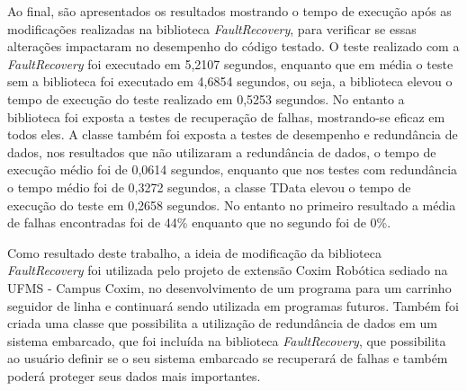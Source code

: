 Ao final, são apresentados os resultados  mostrando o tempo de execução após as modificações realizadas na biblioteca \textit{FaultRecovery}, para verificar se essas alterações impactaram no desempenho do código testado. O teste realizado com a \textit{FaultRecovery} foi executado em 5,2107 segundos, enquanto que em média o teste sem a biblioteca foi executado em 4,6854 segundos, ou seja, a biblioteca elevou o tempo de execução do teste realizado em 0,5253 segundos. No entanto a biblioteca foi exposta a testes de recuperação de falhas, mostrando-se eficaz em todos eles. A classe também foi exposta a testes de desempenho e redundância de dados, nos resultados que não utilizaram a redundância de dados, o tempo de execução médio foi de 0,0614 segundos, enquanto que nos testes com redundância o tempo médio foi de 0,3272 segundos, a classe TData elevou o tempo de execução do teste em 0,2658 segundos. No entanto no primeiro resultado a média de falhas encontradas foi de 44\% enquanto que no segundo foi de 0\%.

Como resultado deste trabalho, a ideia de modificação da biblioteca \textit{FaultRecovery} foi utilizada pelo projeto de extensão Coxim Robótica sediado na UFMS - Campus Coxim, no desenvolvimento de um programa para um carrinho seguidor de linha e continuará sendo utilizada em programas futuros. Também foi criada uma classe que possibilita a utilização de redundância de dados em um sistema embarcado, que foi incluída na biblioteca \textit{FaultRecovery}, que possibilita ao usuário definir se o seu sistema embarcado se recuperará de falhas e também poderá proteger seus dados mais importantes.